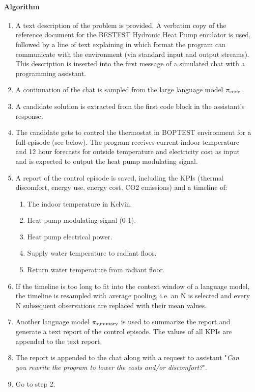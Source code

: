 \paragraph{Algorithm}

\begin{enumerate}
  \item A text description of the problem is provided. A verbatim copy of the reference document for the BESTEST Hydronic Heat Pump emulator is used, followed by a line of text explaining in which format the program can communicate with the environment (via standard input and output streams). This description is inserted into the first message of a simulated chat with a programming assistant.
  \item A continuation of the chat is sampled from the large language model $\pi_\text{code}$.
  \item A candidate solution is extracted from the first code block in the assistant’s response.
  \item The candidate gets to control the thermostat in BOPTEST environment for a full episode (see below). The program receives current indoor temperature and 12 hour forecasts for outside temperature and electricity cost as input and is expected to output the heat pump modulating signal.
  \item A report of the control episode is saved, including the KPIs (thermal discomfort, energy use, energy cost, CO2 emissions) and a timeline of:
  \begin{enumerate}
      \item The indoor temperature in Kelvin.
      \item Heat pump modulating signal (0-1).
      \item Heat pump electrical power.
      \item Supply water temperature to radiant floor.
      \item Return water temperature from radiant floor.
  \end{enumerate}
  \item If the timeline is too long to fit into the context window of a language model, the timeline is resampled with average pooling, i.e. an N is selected and every N subsequent observations are replaced with their mean values.
  \item Another language model $\pi_\text{summary}$ is used to summarize the report and generate a text report of the control episode. The values of all KPIs are appended to the text report.
  \item The report is appended to the chat along with a request to assistant "\textit{Can you rewrite the program to lower the costs and/or discomfort?}".
  \item Go to step 2.
\end{enumerate}

